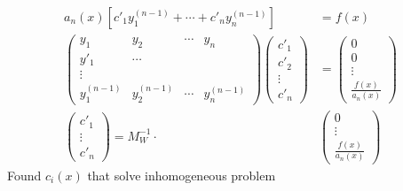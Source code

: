 \documentclass[Maths.tex]{subfiles}
\begin{document}
\begin{align*}
    a_n(x)\left[c'_1y_1^{(n-1)} + \cdots + c'_ny_n^{(n-1)}\right] &= f(x) \\
    \begin{pmatrix} y_1 & y_2 & \cdots & y_n \\ y'_1 & \cdots & & \\ \vdots & & & \\ y_1^{(n-1)} & y_2^{(n-1)} & \cdots & y_n^{(n-1)}\end{pmatrix} \begin{pmatrix} c'_1 \\ c'_2 \\ \vdots \\ c'_n \end{pmatrix} &= \begin{pmatrix} 0 \\ 0 \\ \vdots \\ \frac{f(x)}{a_n(x)} \end{pmatrix} \\
    \begin{pmatrix} c'_1 \\ \vdots \\ c'_n \end{pmatrix} = M_W^{-1} \cdot& \begin{pmatrix} 0 \\ \vdots \\ \frac{f(x)}{a_n(x)} \end{pmatrix}
\end{align*}
Found $c_i(x)$ that solve inhomogeneous problem
\end{document}
